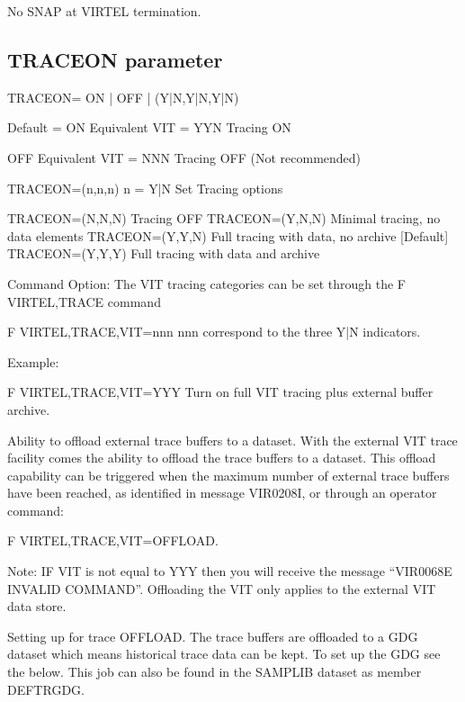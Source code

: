 \documentclass[letterpaper,10pt,english]{sphinxmanual}
\begin{document}
\sphinxAtStartPar
{} \sphinxhyphen{} No SNAP at VIRTEL termination.

\ignorespaces 

\subsection{TRACEON parameter}
\label{\detokenize{Installation_Guide:traceon-parameter}}\label{\detokenize{Installation_Guide:index-131}}
\begin{sphinxVerbatim}[commandchars=\\\{\}]
TRACEON= ON | OFF | (Y|N,Y|N,Y|N)

Default = ON    Equivalent VIT = YYN    Tracing ON

OFF             Equivalent VIT = NNN    Tracing OFF (Not recommended)

TRACEON=(n,n,n)         n = Y|N         Set Tracing options

TRACEON=(N,N,N)                 Tracing OFF
TRACEON=(Y,N,N)                 Minimal tracing, no data elements
TRACEON=(Y,Y,N)                 Full tracing with data, no archive [Default]
TRACEON=(Y,Y,Y)                 Full tracing with data and archive

Command Option:
The VIT tracing categories can be set through the F VIRTEL,TRACE command

F VIRTEL,TRACE,VIT=nnn                  nnn correspond to the three Y|N indicators.

Example:

F VIRTEL,TRACE,VIT=YYY                  Turn on full VIT tracing plus external buffer archive.

Ability to offload external trace buffers to a dataset.
With the external VIT trace facility comes the ability to offload the trace buffers to a dataset. This offload capability can be triggered when the maximum number of external trace buffers have been reached, as identified in message VIR0208I, or through an operator command:

F VIRTEL,TRACE,VIT=OFFLOAD.

Note: IF VIT is not equal to YYY then you will receive the message “VIR0068E INVALID COMMAND”. Offloading the VIT only applies to the external VIT data store.

Setting up for trace \PYGZdq{}OFFLOAD\PYGZdq{}.
The trace buffers are offloaded to a GDG dataset which means historical trace data can be kept. To set up the GDG see the below. This job can also be found in the SAMPLIB dataset as member DEFTRGDG.


\end{sphinxVerbatim}
\end{document}
